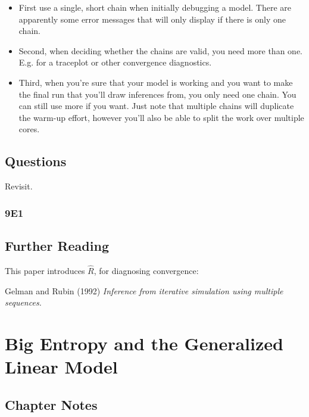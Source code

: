 \documentclass[
]{book}
\providecommand{\tightlist}{%
  \setlength{\itemsep}{0pt}\setlength{\parskip}{0pt}}
\begin{document}
\begin{itemize}
\tightlist
\item
  First use a single, short chain when initially debugging a model. There are apparently some error messages that will only display if there is only one chain.
\item
  Second, when deciding whether the chains are valid, you need more than one. E.g. for a traceplot or other convergence diagnostics.
\item
  Third, when you're sure that your model is working and you want to make the final run that you'll draw inferences from, you only need one chain. You can still use more if you want. Just note that multiple chains will duplicate the warm-up effort, however you'll also be able to split the work over multiple cores.
\end{itemize}

\hypertarget{questions-8}{%
\section{Questions}\label{questions-8}}

Revisit.

\hypertarget{e1-7}{%
\subsection*{9E1}\label{e1-7}}

\hypertarget{further-reading-7}{%
\section*{Further Reading}\label{further-reading-7}}

This paper introduces \(\hat{R}\), for diagnosing convergence:

Gelman and Rubin (1992) \emph{Inference from iterative simulation using multiple sequences.}

\hypertarget{big_entropy}{%
\chapter{Big Entropy and the Generalized Linear Model}\label{big_entropy}}

\hypertarget{chapter-notes-9}{%
\section{Chapter Notes}\label{chapter-notes-9}}
\end{document}
